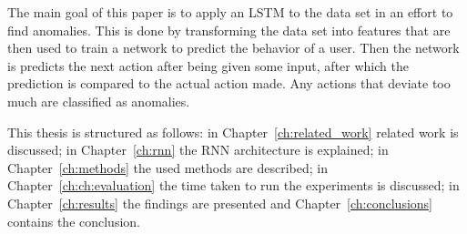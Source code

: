 The main goal of this paper is to apply an LSTM to the data set in an effort to find anomalies. This is done by transforming the data set into features that are then used to train a network to predict the behavior of a user. Then the network is predicts the next action after being given some input, after which the prediction is compared to the actual action made. Any actions that deviate too much are classified as anomalies.

This thesis is structured as follows: in Chapter~\ref{ch:related_work} related work is discussed; in Chapter~\ref{ch:rnn} the RNN architecture is explained; in Chapter~\ref{ch:methods} the used methods are described; in Chapter~\ref{ch:ch:evaluation} the time taken to run the experiments is discussed; in Chapter~\ref{ch:results} the findings are presented and Chapter~\ref{ch:conclusions} contains the conclusion.